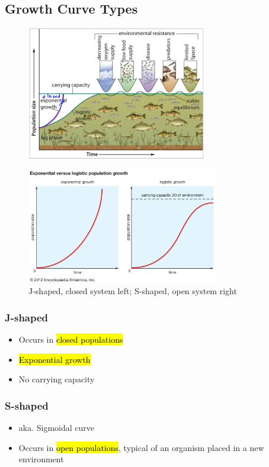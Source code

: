 \documentclass[a4paper,12pt]{article}
\begin{document}
\subsection{Growth Curve Types}
\begin{figure}[H]
    \centering
    \includegraphics[width=0.7\textwidth]{curves}
\end{figure}
\begin{figure}[H]
    \centering
    \includegraphics[width=0.75\textwidth]{scurve}
    \caption{J-shaped, closed system left; S-shaped, open system right}
\end{figure}
\subsubsection{J-shaped}
\begin{itemize}
    \item{Occurs in \hl{closed populations}}
    \item{\hl{Exponential growth}}
    \item{No carrying capacity}
\end{itemize}
\subsubsection{S-shaped}
\begin{itemize}
    \item{aka. Sigmoidal curve}
    \item{Occurs in \hl{open populations}, typical of an organism placed in a new environment}
\end{itemize}
\end{document}
